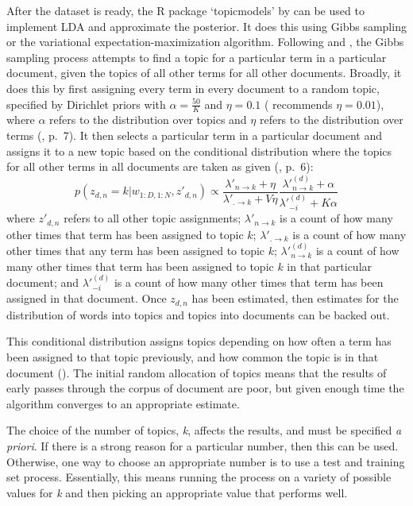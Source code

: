 \documentclass[12pt,]{article}
\begin{document}
After the dataset is ready, the R package `topicmodels' by
\citet{Grun2011} can be used to implement LDA and approximate the
posterior. It does this using Gibbs sampling or the variational
expectation-maximization algorithm. Following
\citet{SteyversGriffiths2006} and \citet{Darling2011}, the Gibbs
sampling process attempts to find a topic for a particular term in a
particular document, given the topics of all other terms for all other
documents. Broadly, it does this by first assigning every term in every
document to a random topic, specified by Dirichlet priors with
\(\alpha = \frac{50}{K}\) and \(\eta = 0.1\)
(\citet{SteyversGriffiths2006} recommends \(\eta = 0.01\)), where
\(\alpha\) refers to the distribution over topics and \(\eta\) refers to
the distribution over terms (\citet{Grun2011}, p.~7). It then selects a
particular term in a particular document and assigns it to a new topic
based on the conditional distribution where the topics for all other
terms in all documents are taken as given (\citet{Grun2011}, p.~6):
\[p(z_{d, n}=k | w_{1:D, 1:N}, z'_{d, n}) \propto \frac{\lambda'_{n\rightarrow k}+\eta}{\lambda'_{.\rightarrow k}+V\eta} \frac{\lambda'^{(d)}_{n\rightarrow k}+\alpha}{\lambda'^{(d)}_{-i}+K\alpha} \]
where \(z'_{d, n}\) refers to all other topic assignments;
\(\lambda'_{n\rightarrow k}\) is a count of how many other times that
term has been assigned to topic \(k\); \(\lambda'_{.\rightarrow k}\) is
a count of how many other times that any term has been assigned to topic
\(k\); \(\lambda'^{(d)}_{n\rightarrow k}\) is a count of how many other
times that term has been assigned to topic \(k\) in that particular
document; and \(\lambda'^{(d)}_{-i}\) is a count of how many other times
that term has been assigned in that document. Once \(z_{d,n}\) has been
estimated, then estimates for the distribution of words into topics and
topics into documents can be backed out.

This conditional distribution assigns topics depending on how often a
term has been assigned to that topic previously, and how common the
topic is in that document (\citet{SteyversGriffiths2006}). The initial
random allocation of topics means that the results of early passes
through the corpus of document are poor, but given enough time the
algorithm converges to an appropriate estimate.

The choice of the number of topics, \emph{k}, affects the results, and
must be specified \emph{a priori}. If there is a strong reason for a
particular number, then this can be used. Otherwise, one way to choose
an appropriate number is to use a test and training set process.
Essentially, this means running the process on a variety of possible
values for \emph{k} and then picking an appropriate value that performs
well.
\end{document}
